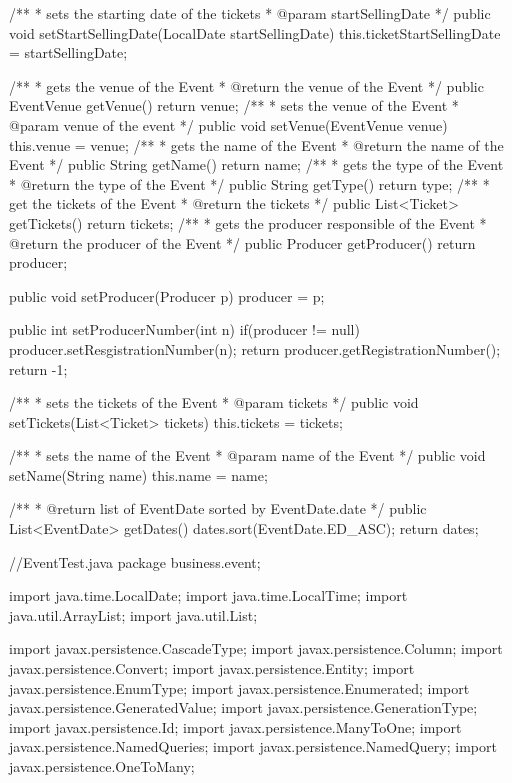 \begin{prompt}
{    /**
     * sets the starting date of the tickets
     * @param startSellingDate
     */
    public void setStartSellingDate(LocalDate startSellingDate) {
      this.ticketStartSellingDate = startSellingDate;
    }
    
    /**
     * gets the venue of the Event
     * @return the venue of the Event
     */
    public EventVenue getVenue() {
      return venue;
    }
    /**
     * sets the venue of the Event
     * @param venue of the event
     */
    public void setVenue(EventVenue venue) {
      this.venue = venue;
    }
    /**
     * gets the name of the Event
     * @return the name of the Event
     */
    public String getName() {
      return name;
    }
    /**
     * gets the type of the Event
     * @return the type of the Event
     */
    public String getType() {
      return type;
    }
    /**
     * get the tickets of the Event
     * @return the tickets
     */
    public List<Ticket> getTickets() {
      return tickets;
    }
    /**
     * gets the producer responsible of the Event
     * @return the producer of the Event
     */
    public Producer getProducer() {
      return producer;
    }
  
    public void setProducer(Producer p){
      producer = p;
    }
  
    public int setProducerNumber(int n){
      if(producer != null){
        producer.setResgistrationNumber(n);
        return producer.getRegistrationNumber();
      }
      return -1;
    }
    
    /**
     * sets the tickets of the Event
     * @param tickets
     */
    public void setTickets(List<Ticket> tickets) {
      this.tickets = tickets;
    }
    
    /**
     * sets the name of the Event
     * @param name of the Event
     */
    public void setName(String name) {
      this.name = name;
    }
  
    /**
     * @return list of EventDate sorted by EventDate.date
     */
    public List<EventDate> getDates() {
      dates.sort(EventDate.ED_ASC);
      return dates;
    }
  }
  
  //EventTest.java
  package business.event;
  
  
  
  import java.time.LocalDate;
  import java.time.LocalTime;
  import java.util.ArrayList;
  import java.util.List;
  
  import javax.persistence.CascadeType;
  import javax.persistence.Column;
  import javax.persistence.Convert;
  import javax.persistence.Entity;
  import javax.persistence.EnumType;
  import javax.persistence.Enumerated;
  import javax.persistence.GeneratedValue;
  import javax.persistence.GenerationType;
  import javax.persistence.Id;
  import javax.persistence.ManyToOne;
  import javax.persistence.NamedQueries;
  import javax.persistence.NamedQuery;
  import javax.persistence.OneToMany;
  

\end{prompt}
